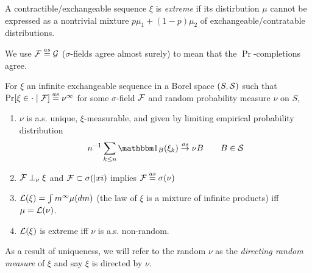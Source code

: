 \begin{definition}
  A contractible/exchangeable sequence $\xi$ is \emph{extreme} if
  its distirbution $\mu$ cannot be expressed as a nontrivial mixture
  $p \mu_1 + (1-p) \mu_2$ of exchangeable/contratable distributions.

  We use $\mathcal{F} \overset{as}{=} \mathcal{G}$ ($\sigma$-fields agree almost surely)
  to mean that the $\Pr$-completions agree.
\end{definition}

\begin{proposition}
  For $\xi$ an infinite exchangeable sequence in a Borel space $(S, \mathcal{S})$
  such that $\Pr[\xi \in \cdot \mid \mathcal{F}] \overset{as}{=} \nu^\infty$ for some
  $\sigma$-field $\mathcal{F}$ and random probability measure $\nu$ on $S$,
  \begin{enumerate}
    \item $\nu$ is a.s. unique, $\xi$-measurable, and given by
      limiting empirical probability distribution
      \[
        n^{-1} \sum_{k \leq n} \ind_B(\xi_k) \asto \nu B\qquad B \in \cS
      \]
    \item $\mathcal{F} \perp_\nu \xi$ and $\mathcal{F} \subset \sigma(|xi)$ implies
      $\mathcal{F} \overset{as}{=} \sigma(\nu)$
    \item $\mathcal{L}(\xi) = \int m^\infty \mu(dm)$
      (the law of $\xi$ is a mixture of infinite products)
      iff $\mu = \mathcal{L}(\nu)$.
    \item $\mathcal{L}(\xi)$ is extreme iff $\nu$ is a.s. non-random.
  \end{enumerate}
\end{proposition}

As a result of uniqueness, we will refer to the random $\nu$ as the
\emph{directing random measure} of $\xi$ and say $\xi$ is directed by $\nu$.

